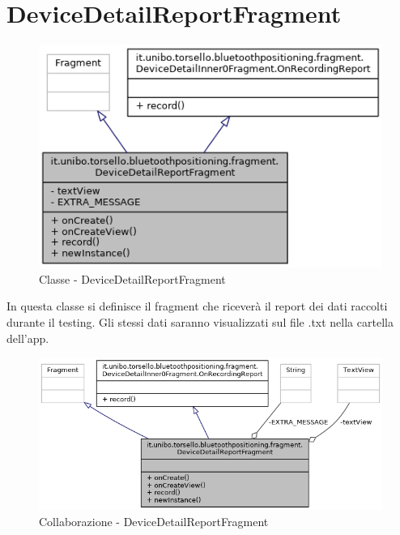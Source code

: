 \section{DeviceDetailReportFragment}
\begin{figure}[ph]
	\centering
	\includegraphics[width=0.65\linewidth]{img/uml/class/classit_1_1unibo_1_1torsello_1_1bluetoothpositioning_1_1fragment_1_1DeviceDetailReportFragment__inherit__graph.png}
	\caption{Classe - DeviceDetailReportFragment}
\end{figure}

In questa classe si definisce il fragment che riceverà il report dei dati raccolti durante il testing. Gli stessi dati saranno visualizzati sul file .txt nella cartella dell'app.

\begin{figure}[ph]
	\centering
	\includegraphics[width=0.9\linewidth]{img/uml/class/classit_1_1unibo_1_1torsello_1_1bluetoothpositioning_1_1fragment_1_1DeviceDetailReportFragment__coll__graph.png}
	\caption{Collaborazione - DeviceDetailReportFragment}
\end{figure}

\newpage
